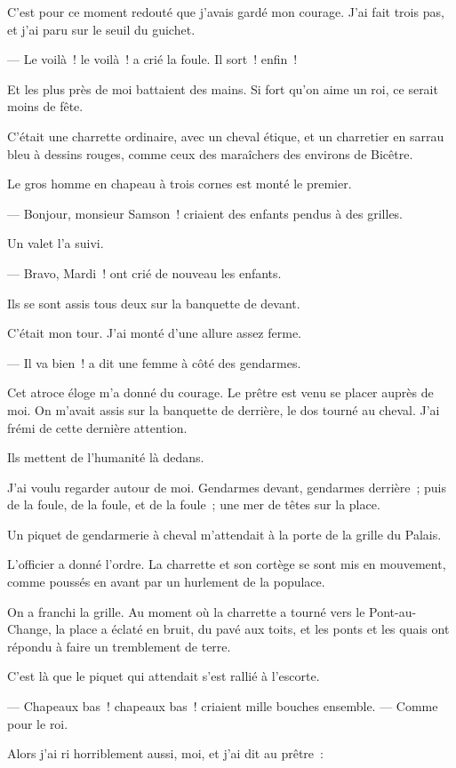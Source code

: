 \documentclass[french,twoside]{book} %
\begin{document}
C’est pour ce moment redouté que j’avais gardé mon courage. J’ai fait trois pas, et j’ai paru sur le seuil du guichet.\par
— Le voilà ! le voilà ! a crié la foule. Il sort ! enfin !\par
Et les plus près de moi battaient des mains. Si fort qu’on aime un roi, ce serait moins de fête.\par
C’était une charrette ordinaire, avec un cheval étique, et un charretier en sarrau bleu à dessins rouges, comme ceux des maraîchers des environs de Bicêtre.\par
Le gros homme en chapeau à trois cornes est monté le premier.\par
— Bonjour, monsieur Samson ! criaient des enfants pendus à des grilles.\par
Un valet l’a suivi.\par
 — Bravo, Mardi ! ont crié de nouveau les enfants.\par
Ils se sont assis tous deux sur la banquette de devant.\par
C’était mon tour. J’ai monté d’une allure assez ferme.\par
— Il va bien ! a dit une femme à côté des gendarmes.\par
Cet atroce éloge m’a donné du courage. Le prêtre est venu se placer auprès de moi. On m’avait assis sur la banquette de derrière, le dos tourné au cheval. J’ai frémi de cette dernière attention.\par
Ils mettent de l’humanité là dedans.\par
J’ai voulu regarder autour de moi. Gendarmes devant, gendarmes derrière ; puis de la foule, de la foule, et de la foule ; une mer de têtes sur la place.\par
Un piquet de gendarmerie à cheval m’attendait à la porte de la grille du Palais.\par
L’officier a donné l’ordre. La charrette et son cortège se sont mis en mouvement, comme poussés en avant par un hurlement de la populace.\par
On a franchi la grille. Au moment où la charrette a tourné vers le Pont-au-Change, la place a éclaté en bruit, du pavé aux toits, et les ponts et les quais ont répondu à faire un tremblement de terre.\par
C’est là que le piquet qui attendait s’est rallié à l’escorte.\par
— Chapeaux bas ! chapeaux bas ! criaient mille bouches ensemble. — Comme pour le roi.\par
Alors j’ai ri horriblement aussi, moi, et j’ai dit au prêtre :\par
\end{document}
